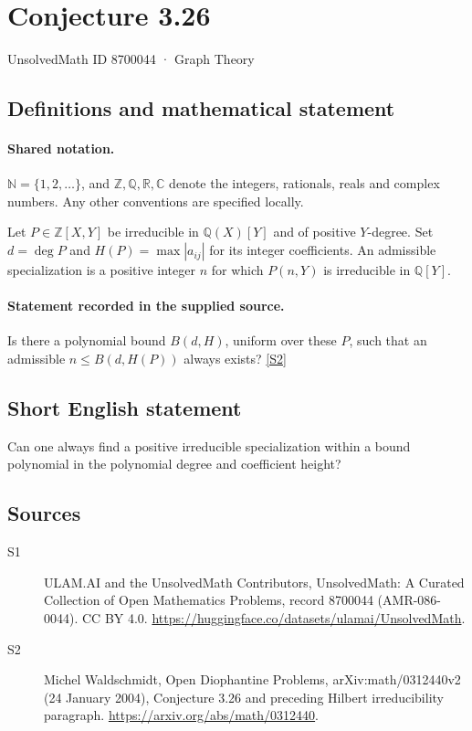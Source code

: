 \documentclass[11pt]{article}
\newcommand{\sref}[2]{\hyperlink{source:#1:#2}{[S#2]}}
\begin{document}
\setcounter{section}{8700043}
\section{Conjecture 3.26}\label{8700044}
{\small\sffamily UnsolvedMath ID 8700044 · Graph Theory}
\subsection{Definitions and mathematical statement}

\paragraph{Shared notation.}$\mathbb N=\{1,2,\ldots\}$, and $\mathbb Z,\mathbb Q,\mathbb R,\mathbb C$ denote the integers, rationals, reals and complex numbers. Any other conventions are specified locally.


Let $P\in\mathbb Z[X,Y]$ be irreducible in $\mathbb Q(X)[Y]$ and of positive $Y$-degree. Set $d=\deg P$ and $H(P)=\max|a_{ij}|$ for its integer coefficients. An admissible specialization is a positive integer $n$ for which $P(n,Y)$ is irreducible in $\mathbb Q[Y]$.
\paragraph{Statement recorded in the supplied source.}
Is there a polynomial bound $B(d,H)$, uniform over these $P$, such that an admissible $n\le B(d,H(P))$ always exists? \sref{8700044}{2}
\subsection{Short English statement}
Can one always find a positive irreducible specialization within a bound polynomial in the polynomial degree and coefficient height?
\subsection{Sources}
\begin{description}
\item[\hypertarget{source:8700044:1}{S1}] ULAM.AI and the UnsolvedMath Contributors, UnsolvedMath: A Curated Collection of Open Mathematics Problems, record 8700044 (AMR-086-0044). CC BY 4.0. \url{https://huggingface.co/datasets/ulamai/UnsolvedMath}.
\item[\hypertarget{source:8700044:2}{S2}] Michel Waldschmidt, Open Diophantine Problems, arXiv:math/0312440v2 (24 January 2004), Conjecture 3.26 and preceding Hilbert irreducibility paragraph. \url{https://arxiv.org/abs/math/0312440}.
\end{description}
\label{end:8700044}
\end{document}
